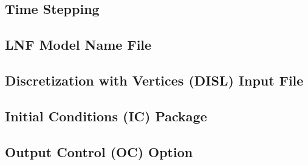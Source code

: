 \subsection{Time Stepping}


\newpage
\subsection{LNF Model Name File}


\newpage
\subsection{Discretization with Vertices (DISL) Input File}


\newpage
\subsection{Initial Conditions (IC) Package}


\newpage
\subsection{Output Control (OC) Option}


